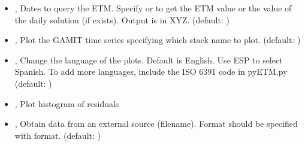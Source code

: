 \documentclass[letterpaper,10pt,english]{sphinxmanual}
\begin{document}
\begin{itemize}
\item {} 
\sphinxAtStartPar
{\hyperref[\detokenize{pgamit.com:PlotETM.py--q}]{}} , {\hyperref[\detokenize{pgamit.com:PlotETM.py---query}]{}}  \sphinxhyphen{} Dates to query the ETM. Specify  or  to get the ETM value or the value of the daily solution (if exists). Output is in XYZ. (default: )

\item {} 
\sphinxAtStartPar
{\hyperref[\detokenize{pgamit.com:PlotETM.py--gamit}]{}} , {\hyperref[\detokenize{pgamit.com:PlotETM.py---gamit}]{}}  \sphinxhyphen{} Plot the GAMIT time series specifying which stack name to plot. (default: )

\item {} 
\sphinxAtStartPar
{\hyperref[\detokenize{pgamit.com:PlotETM.py--lang}]{}} , {\hyperref[\detokenize{pgamit.com:PlotETM.py---language}]{}}  \sphinxhyphen{} Change the language of the plots. Default is English. Use ESP to select Spanish. To add more languages, include the ISO 639\sphinxhyphen{}1 code in pyETM.py (default: )

\item {} 
\sphinxAtStartPar
{\hyperref[\detokenize{pgamit.com:PlotETM.py--hist}]{}}, {\hyperref[\detokenize{pgamit.com:PlotETM.py---histogram}]{}} \sphinxhyphen{} Plot histogram of residuals

\item {} 
\sphinxAtStartPar
{\hyperref[\detokenize{pgamit.com:PlotETM.py--file}]{}} , {\hyperref[\detokenize{pgamit.com:PlotETM.py---filename}]{}}  \sphinxhyphen{} Obtain data from an external source (filename). Format should be specified with \sphinxhyphen{}format. (default: )


\end{itemize}
\end{document}
